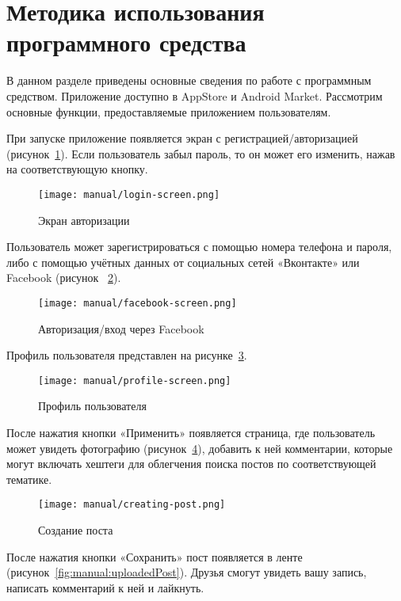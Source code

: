 \section{Методика использования программного средства}
\label{sec:manual}

В данном разделе приведены основные сведения по работе с программным средством. 
Приложение доступно в AppStore и Android Market.
Рассмотрим основные функции, предоставляемые приложением пользователям.

При запуске приложение появляется экран с регистрацией/авторизацией (рисунок~\ref{fig:manual:login}).
Если пользователь забыл пароль, то он может его изменить, нажав на
соответствующую кнопку.

\begin{figure}[H]
\centering
	\texttt{[image: manual/login-screen.png]}
	\caption{Экран авторизации}
	\label{fig:manual:login}
\end{figure}

Пользователь может зарегистрироваться с помощью номера телефона и
пароля, либо с помощью учётных данных от социальных сетей «Вконтакте»
или Facebook (рисунок ~\ref{fig:manual:auth}).

\begin{figure}[H]
  \centering
    \texttt{[image: manual/facebook-screen.png]}
    \caption{Авторизация/вход через Facebook}
    \label{fig:manual:auth}
  \end{figure}

Профиль пользователя представлен на рисунке~\ref{fig:manual:profile}.

\begin{figure}[H]
  \centering
    \texttt{[image: manual/profile-screen.png]}
    \caption{Профиль пользователя}
    \label{fig:manual:profile}
  \end{figure}

После нажатия кнопки «Применить» появляется страница, где
пользователь может увидеть фотографию (рисунок~\ref{fig:manual:creatingPost}), добавить к ней
комментарии, которые могут включать хештеги для облегчения поиска постов
по соответствующей тематике.

\begin{figure}[H]
    \centering
      \texttt{[image: manual/creating-post.png]}
      \caption{Создание поста}
      \label{fig:manual:creatingPost}
\end{figure}

После нажатия кнопки «Сохранить» пост появляется в ленте (рисунок~\ref{fig:manual:uploadedPost}). Друзья смогут увидеть вашу запись, написать комментарий к ней и
лайкнуть.

